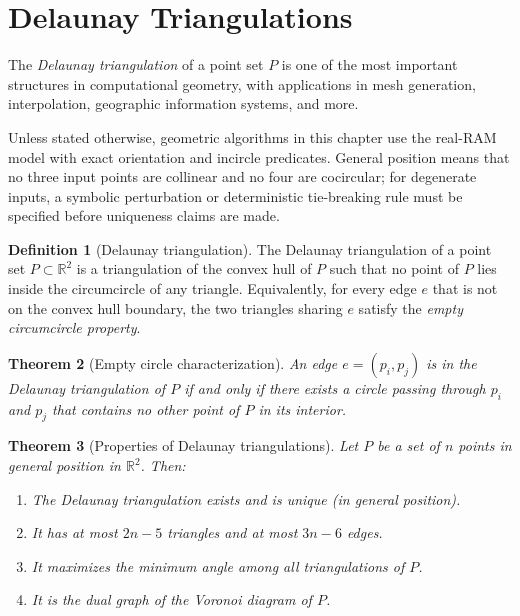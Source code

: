 \documentclass[twoside,12pt]{book}
\theoremstyle{plain}
\newtheorem{theorem}{Theorem}[chapter]
\theoremstyle{definition}
\newtheorem{definition}[theorem]{Definition}
\theoremstyle{remark}
\begin{document}
\section{Delaunay Triangulations}
\label{sec:delaunay}

The \emph{Delaunay triangulation} of a point set $P$ is one of the most important structures in computational geometry, with applications in mesh generation, interpolation, geographic information systems, and more.

Unless stated otherwise, geometric algorithms in this chapter use the real-RAM
model with exact orientation and incircle predicates. General position means
that no three input points are collinear and no four are cocircular; for
degenerate inputs, a symbolic perturbation or deterministic tie-breaking rule
must be specified before uniqueness claims are made.

\begin{definition}[Delaunay triangulation]
The Delaunay triangulation of a point set $P \subset \mathbb{R}^2$ is a triangulation of the convex hull of $P$ such that no point of $P$ lies inside the circumcircle of any triangle. Equivalently, for every edge $e$ that is not on the convex hull boundary, the two triangles sharing $e$ satisfy the \emph{empty circumcircle property}.
\end{definition}

\begin{theorem}[Empty circle characterization]
An edge $e = (p_i, p_j)$ is in the Delaunay triangulation of $P$ if and only if there exists a circle passing through $p_i$ and $p_j$ that contains no other point of $P$ in its interior.
\end{theorem}

\begin{theorem}[Properties of Delaunay triangulations]
\label{thm:delaunay-props}
Let $P$ be a set of $n$ points in general position in $\mathbb{R}^2$. Then:
\begin{enumerate}[nosep]
    \item The Delaunay triangulation exists and is unique (in general position).
    \item It has at most $2n - 5$ triangles and at most $3n - 6$ edges.
    \item It maximizes the minimum angle among all triangulations of $P$.
    \item It is the dual graph of the Voronoi diagram of $P$.
\end{enumerate}
\end{theorem}
\end{document}
